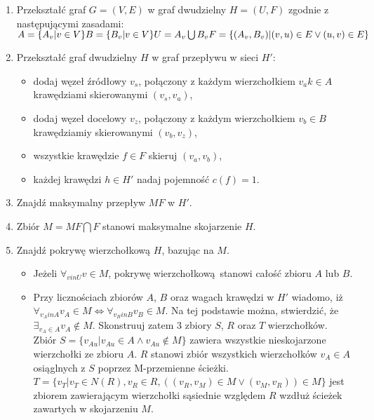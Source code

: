 \begin{enumerate}
  \item Przekształć graf $G=(V,E)$ w graf dwudzielny $H=(U,F)$ zgodnie z
    następującymi zasadami:\\
    $A=\{A_v|v \in V\}\\
    B=\{B_v|v \in V\}\\
    U=A_v \bigcup B_v
    F=\{(A_v, B_v)|(v,u) \in E \lor (u,v) \in E\}$
  \item Przekształć graf dwudzielny $H$ w graf przepływu w sieci $H\prime$:
    \begin{itemize}
      \item dodaj węzeł źródłowy $v_s$, połączony z każdym wierzchołkiem $v_a
        k\in A$ krawędziami skierowanymi $(v_s, v_a)$,
      \item dodaj węzeł docelowy $v_z$, połączony z każdym wierzchołkiem $v_b
        \in B$ krawędziamiy skierowanymi $(v_b, v_z)$,
      \item wszystkie krawędzie $f \in F$ skieruj $(v_a, v_b)$,
      \item każdej krawędzi $h \in H\prime$ nadaj pojemność $c(f)=1$.
    \end{itemize}
  \item Znajdź maksymalny przepływ $MF$ w $H\prime$.
  \item Zbiór $M=MF \bigcap F$ stanowi maksymalne skojarzenie $H$.
  \item Znajdź pokrywę wierzchołkową $H$, bazując na $M$.
    \begin{itemize}
      \item Jeżeli $\forall_{v in U}{v \in M}$, pokrywę
        wierzchołkową~stanowi całość zbioru $A$ lub $B$.
      \item Przy licznościach zbiorów $A$, $B$ oraz wagach krawędzi w $H\prime$
        wiadomo, iż ${\forall_{v_A in A}{v_A \in M} \iff \forall_{v_B in B}{v_B \in M}}$.
        Na tej podstawie można, stwierdzić, że $\exists_{v_A \in A}{v_A \notin
        M}$.
        Skonstruuj zatem 3 zbiory $S$, $R$ oraz $T$ wierzchołków. Zbiór
        $S = \{v_{Au}|v_{Au} \in A \land v_{Au} \notin M\}$ zawiera wszystkie
        nieskojarzone wierzchołki ze zbioru $A$.
        $R$ stanowi zbiór wszystkich wierzchołków $v_A \in A$ osiąglnych z $S$
        poprzez M-przemienne ścieżki. \\
        $T=\{v_T|v_T \in N(R), v_R \in R, ((v_R,v_M) \in M \lor (v_M,v_R)) \in M\}$ 
        jest zbiorem zawierającym wierzchołki sąsiednie względem $R$ wzdłuż 
        ścieżek zawartych w skojarzeniu $M$.

\end{itemize}
\end{enumerate}
